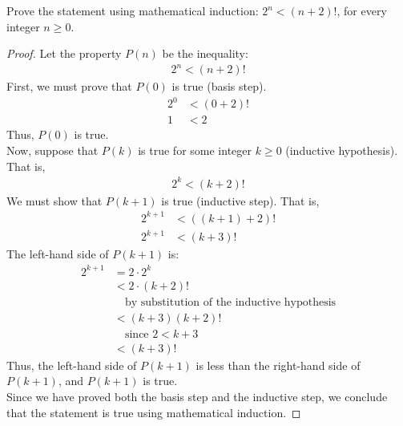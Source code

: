 \documentclass[name=Ojas\ Chaturvedi, emailid=oj.chaturvedi.2024, course=Capstone:\ Discrete\ Math, num=8, deadline={November\ 2,\ 2023}]{homework}
\begin{document}
Prove the statement using mathematical induction: $2^n < (n+2)!$, for every integer $n \geq 0$.
\begin{proof}
    Let the property $P(n)$ be the inequality:
    \begin{align*}
        2^n < (n+2)!
    \end{align*}
    First, we must prove that $P(0)$ is true (basis step).
    \begin{align*}
        2^0 &< (0+2)! \\
        1 &< 2
    \end{align*}
    Thus, $P(0)$ is true. \\
    Now, suppose that $P(k)$ is true for some integer $k \geq 0$ (inductive hypothesis). That is,
    \begin{align*}
        2^k < (k+2)!
    \end{align*}
    We must show that $P(k+1)$ is true (inductive step). That is,
    \begin{align*}
        2^{k+1} &< ((k+1)+2)! \\
        2^{k+1} &< (k+3)!
    \end{align*}
    The left-hand side of $P(k+1)$ is:
    \begin{align*}
        2^{k+1} &= 2 \cdot 2^k \\
        &< 2 \cdot (k+2)! \\
        & \quad \text{by substitution of the inductive hypothesis} \\
        &< (k+3)(k+2)! \\
        & \quad \text{since $2 < k+3$} \\
        &< (k+3)!
    \end{align*}
    Thus, the left-hand side of $P(k+1)$ is less than the right-hand side of $P(k+1)$, and $P(k+1)$ is true. \\
    Since we have proved both the basis step and the inductive step, we conclude that the statement is true using mathematical induction.
\end{proof}
\end{document}
